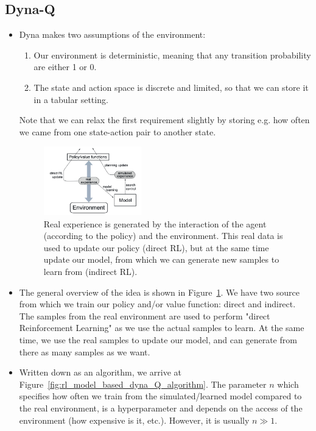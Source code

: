 \subsection{Dyna-Q}
\begin{itemize}
	\item Dyna makes two assumptions of the environment:
	\begin{enumerate}
		\item Our environment is deterministic, meaning that any transition probability are either 1 or 0. 
		\item The state and action space is discrete and limited, so that we can store it in a tabular setting.
	\end{enumerate}
	Note that we can relax the first requirement slightly by storing e.g. how often we came from one state-action pair to another state.
	\begin{figure}[ht!]
		\centering
		\includegraphics[width=0.4\textwidth]{figures/rl_model_based_dyna_Q.png}
		\caption{Real experience is generated by the interaction of the agent (according to the policy) and the environment. This real data is used to update our policy (direct RL), but at the same time update our model, from which we can generate new samples to learn from (indirect RL).}
		\label{fig:rl_model_based_dyna_Q}
	\end{figure}
	\item The general overview of the idea is shown in Figure~\ref{fig:rl_model_based_dyna_Q}. We have two source from which we train our policy and/or value function: direct and indirect. The samples from the real environment are used to perform "direct Reinforcement Learning" as we use the actual samples to learn. At the same time, we use the real samples to update our model, and can generate from there as many samples as we want.
	\item Written down as an algorithm, we arrive at Figure~\ref{fig:rl_model_based_dyna_Q_algorithm}. The parameter $n$ which specifies how often we train from the simulated/learned model compared to the real environment, is a hyperparameter and depends on the access of the environment (how expensive is it, etc.). However, it is usually $n\gg 1$.

\end{itemize}
